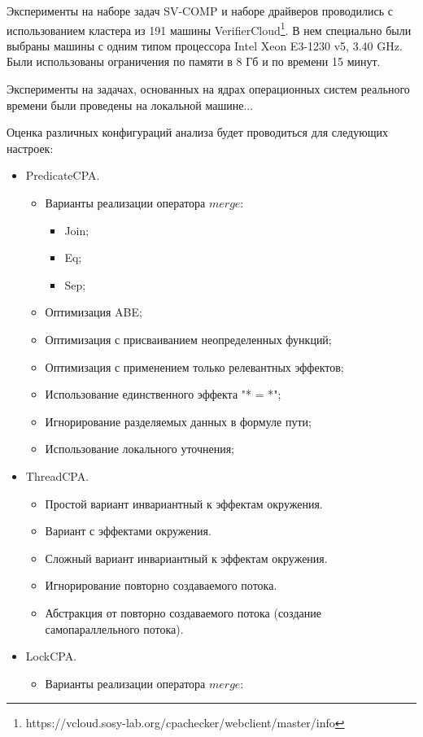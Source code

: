 Эксперименты на наборе задач SV-COMP и наборе драйверов проводились с использованием кластера из 191 машины VerifierCloud\footnote{https://vcloud.sosy-lab.org/cpachecker/webclient/master/info}.
В нем специально были выбраны машины с одним типом процессора Intel Xeon E3-1230 v5, 3.40 GHz.
Были использованы ограничения по памяти в 8 Гб и по времени 15 минут.

Эксперименты на задачах, основанных на ядрах операционных систем реального времени были проведены на локальной машине...

Оценка различных конфигураций анализа будет проводиться для следующих настроек:
\begin{itemize}
\item PredicateCPA.
\begin{itemize}
\item Варианты реализации оператора $merge$:
\begin{itemize}
\item Join;
\item Eq;
\item Sep;
\end{itemize}
\item Оптимизация ABE;
\item Оптимизация с присваиванием неопределенных функций;
\item Оптимизация с применением только релевантных эффектов;
\item Использование единственного эффекта "* = *";
\item Игнорирование разделяемых данных в формуле пути;
\item Использование локального уточнения;
\end{itemize}
\item ThreadCPA.
\begin{itemize}
\item Простой вариант инвариантный к эффектам окружения.
\item Вариант с эффектами окружения.
\item Сложный вариант инвариантный к эффектам окружения.
\item Игнорирование повторно создаваемого потока.
\item Абстракция от повторно создаваемого потока (создание самопараллельного потока).
\end{itemize}
\item LockCPA.
\begin{itemize}
\item Варианты реализации оператора $merge$:
\begin{itemize}

\end{itemize}
\end{itemize}
\end{itemize}
